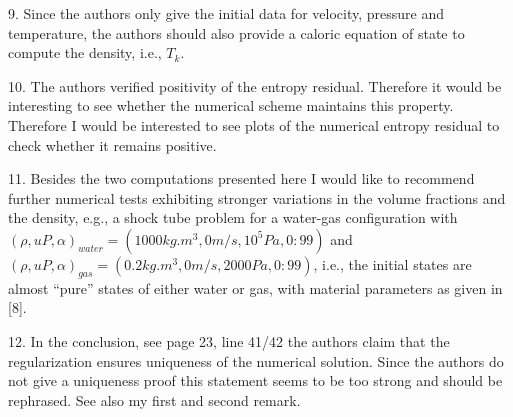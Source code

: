 \documentclass{article}
\begin{document}
\bigskip


{\color{blue}
9. Since the authors only give the initial data for velocity, pressure and temperature,
the authors should also provide a caloric equation of state to compute the density,
i.e., $T_k$.}

\bigskip


{\color{blue}
10. The authors verified positivity of the entropy residual. Therefore it would be 
interesting to see whether the numerical scheme maintains this property. Therefore I
would be interested to see plots of the numerical entropy residual to check whether
it remains positive.}

\bigskip


{\color{blue}
11. Besides the two computations presented here I would like to recommend further
numerical tests exhibiting stronger variations in the volume fractions and the density, 
e.g., a shock tube problem for a water-gas configuration with 
$(\rho, u P, \alpha)_{water} = (1000kg.m^3, 0m/s, 10^5Pa, 0:99)$ and 
$(\rho, u P, \alpha)_{gas}   = (0.2 kg.m^3, 0m/s, 2000Pa, 0:99)$,
i.e., the initial states are almost ``pure'' states of either water or gas, with material
parameters as given in [8].}

\bigskip


{\color{blue}
12. In the conclusion, see page 23, line 41/42 the authors claim that the regularization
ensures uniqueness of the numerical solution. Since the authors do not give a 
uniqueness proof this statement seems to be too strong and should be rephrased. See also
my first and second remark.}

\bigskip


{\color{blue}
}

\bigskip


{\color{blue}
}

\bigskip
\end{document}
